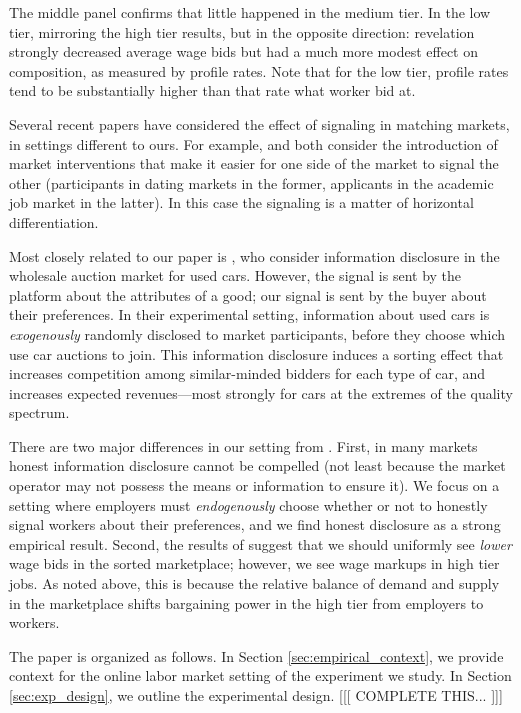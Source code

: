 The middle panel confirms that little happened in the medium tier.
In the low tier, mirroring the high tier results, but in the opposite direction:
revelation strongly decreased average wage bids but had a much more modest effect on composition, as measured by profile rates. 
Note that for the low tier, profile rates tend to be substantially higher than that rate what worker bid at.



Several recent papers have considered the effect of signaling in matching markets, in settings different to ours.
For example, \cite{lee2011propose} and \cite{coles2013preference} both consider the introduction of market interventions that make it easier for one side of the market to signal the other (participants in dating markets in the former, applicants in the academic job market in the latter).
In this case the signaling is a matter of horizontal differentiation.


Most closely related to our paper is \cite{tadelis2011information}, who consider information disclosure in the wholesale auction market for used cars.
However, the signal is sent by the platform about the attributes of a good;
our signal is sent by the buyer about their preferences. 
In their experimental setting, information about used cars is {\em exogenously} randomly disclosed to market participants, before they choose which use car auctions to join.
This information disclosure induces a sorting effect that increases competition among similar-minded bidders for each type of car, and increases expected revenues---most strongly for cars at the extremes of the quality spectrum.

There are two major differences in our setting from \cite{tadelis2011information}.
First, in many markets honest information disclosure cannot be compelled (not least because the market operator may not possess the means or information to ensure it).
We focus on a setting where employers must {\em endogenously} choose whether or not to honestly signal workers about their preferences, and we find honest disclosure as a strong empirical result.
Second, the results of \cite{tadelis2011information} suggest that we should uniformly see {\em lower} wage bids in the sorted marketplace; however, we see wage markups in high tier jobs. 
As noted above, this is because the relative balance of demand and supply in the marketplace shifts bargaining power in the high tier from employers to workers. 


The paper is organized as follows.
In Section \ref{sec:empirical_context}, we provide context for the online labor market setting of the experiment we study.
In Section \ref{sec:exp_design}, we outline the experimental design.
[[[ COMPLETE THIS... ]]]

